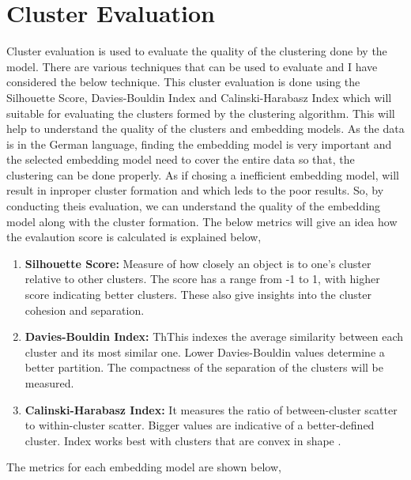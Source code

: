 \section{Cluster Evaluation}

Cluster evaluation is used to evaluate the quality of the clustering done by the model. There are various techniques that can be used to evaluate and
I have considered the below technique. This cluster evaluation is done using the Silhouette Score, Davies-Bouldin Index and Calinski-Harabasz Index which will
suitable for evaluating the clusters formed by the clustering algorithm. This will help to understand the quality of the clusters and embedding models.
As the data is in the German language, finding the embedding model is very important and the selected embedding model need to cover the entire data so that,
the clustering can be done properly. As if chosing a inefficient embedding model, will result in inproper cluster formation and which leds to the poor results.
So, by conducting theis evaluation, we can understand the quality of the embedding model along with the cluster formation. The below metrics will give an idea 
how the evalaution score is calculated is explained below,

\begin{enumerate}
    \item{\textbf{Silhouette Score:}} Measure of how closely an object is to one's cluster relative to other clusters. The score has a range from -1 to 1, with
    higher score indicating better clusters. These also give insights into the cluster cohesion and separation.
    
    \item{\textbf{Davies-Bouldin Index:}} ThThis indexes the average similarity between each cluster and its most similar one. Lower Davies-Bouldin values determine a better partition.
    The compactness of the separation of the clusters will be measured.
    
    \item{\textbf{Calinski-Harabasz Index:}}  It measures the ratio of between-cluster scatter to within-cluster scatter. Bigger values are indicative of a better-defined cluster.
    Index works best with clusters that are convex in shape \cite{geeksforgeeks_clustering_metrics}.
\end{enumerate}


\noindent The metrics for each embedding model are shown below,

